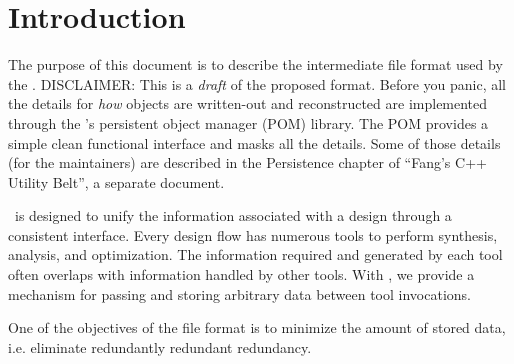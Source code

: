 
\chapter{Introduction}
\label{sec:intro}

The purpose of this document is to describe the intermediate file
format used by the \hackt.  
DISCLAIMER: This is a \emph{draft} of the proposed format.  
Before you panic, all the details for \emph{how} objects are
written-out and reconstructed are implemented through 
the \hackt's persistent object manager (POM) library.  
The POM provides a simple clean functional interface and masks
all the details.  
Some of those details (for the maintainers) are described in
the Persistence chapter of ``Fang's C++ Utility Belt'', a separate document.  

\hackt\ is designed to unify the information associated with a design
through a consistent interface.  
Every design flow has numerous tools to perform synthesis, analysis, 
and optimization.  
The information required and generated by each tool often overlaps
with information handled by other tools.  
With \hackt, we provide a mechanism for passing and storing arbitrary data 
between tool invocations.  

One of the objectives of the file format is to minimize the amount
of stored data, i.e. eliminate redundantly redundant redundancy.  

